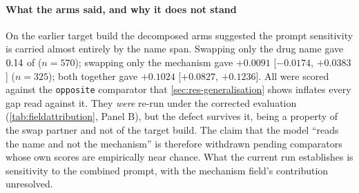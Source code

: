 \paragraph{What the arms said, and why it does not stand} On the earlier target
build the decomposed arms suggested the prompt sensitivity is carried almost
entirely by the name span. Swapping only the drug name gave $0.14$ of
 ($n = 570$); swapping only the mechanism gave
$+0.0091$ [$-0.0174$, $+0.0383$] ($n = 325$); both together gave $+0.1024$
[$+0.0827$, $+0.1236$]. All were scored against the \texttt{opposite}
comparator that \cref{sec:res-generalisation} shows inflates every gap read
against it. They \emph{were} re-run under the corrected evaluation
(\cref{tab:fieldattribution}, Panel B), but the defect survives it, being a
property of the swap partner and not of the target build. The claim that the
model ``reads the name and not the mechanism'' is therefore withdrawn pending
comparators whose own scores are empirically near chance. What the current run
establishes is sensitivity to the combined prompt, with the mechanism field's
contribution unresolved.


